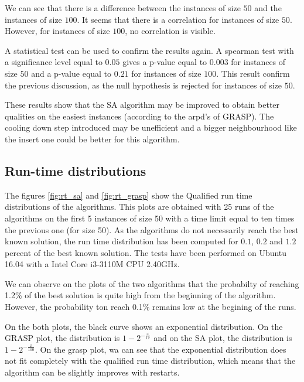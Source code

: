 \documentclass{article}
\begin{document}
We can see that there is a difference between the instances of size $50$ and the instances of size $100$.
It seems that there is a correlation for instances of size $50$.
However, for instances of size $100$, no correlation is visible.\newline

A statistical test can be used to confirm the results again.
A spearman test with a significance level equal to $0.05$ gives a p-value equal to $0.003$ for instances of size $50$ and a p-value equal to 0$.21$ for instances of size $100$.
This result confirm the previous discussion, as the null hypothesis is rejected for instances of size $50$.\newline

These results show that the SA algorithm may be improved to obtain better qualities on the easiest instances (according to the arpd's of GRASP).
The cooling down step introduced may be unefficient and a bigger neighbourhood like the insert one could be better for this algorithm.

\subsection{Run-time distributions}

The figures \ref{fig:rt_sa} and \ref{fig:rt_grasp} show the Qualified run time distributions of the algorithms.
This plots are obtained with 25 runs of the algorithms on the first 5 instances of size 50 with a time limit equal to ten times the previous one (for size 50).
As the algorithms do not necessarily reach the best known solution, the run time distribution has been computed for $0.1$, $0.2$ and $1.2$ percent of the best known solution.
The tests have been performed on Ubuntu 16.04 with a Intel Core i3-3110M CPU 2.40GHz. \newline

We can observe on the plots of the two algorithms that the probabilty of reaching 1.2\% of the best solution is quite high from the beginning of the algorithm.
However, the probability ton reach 0.1\% remains low at the begining of the runs.

On the both plots, the black curve shows an exponential distribution.
On the GRASP plot, the distribution is $1-2^{-\frac{x}{17}}$ and on the SA plot, the distribution is $1-2^{-\frac{x}{100}}$.
On the grasp plot, wa can see that the exponential distribution does not fit completely with the qualified run time distribution, which means that the algorithm can be slightly improves with restarts.\newline
\end{document}
